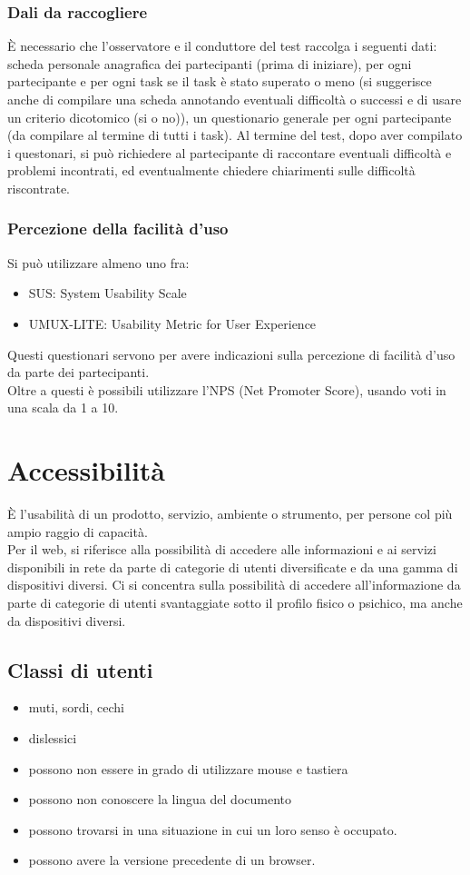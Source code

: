 \documentclass{article}
\begin{document}
\subsubsection{Dali da raccogliere}
È necessario che l'osservatore e il conduttore del test raccolga i seguenti dati: scheda personale anagrafica dei partecipanti (prima di iniziare), per ogni partecipante e per ogni task se il task è stato superato o meno (si suggerisce anche di compilare una scheda annotando eventuali difficoltà o successi e di usare un criterio dicotomico (si o no)), un questionario generale per ogni partecipante (da compilare al termine di tutti i task). Al termine del test, dopo aver compilato i questonari, si può richiedere al partecipante di raccontare eventuali difficoltà e problemi incontrati, ed eventualmente chiedere chiarimenti sulle difficoltà riscontrate.
\subsubsection{Percezione della facilità d'uso}
Si può utilizzare almeno uno fra:
\begin{itemize}
	\item SUS: System Usability Scale
	\item UMUX-LITE: Usability Metric for User Experience
\end{itemize}
Questi questionari servono per avere indicazioni sulla percezione di facilità d'uso da parte dei partecipanti.\\
Oltre a questi è possibili utilizzare l'NPS (Net Promoter Score), usando voti in una scala da 1 a 10.
\section{Accessibilità}
È l'usabilità di un prodotto, servizio, ambiente o strumento, per persone col più ampio raggio di capacità.\\
Per il web, si riferisce alla possibilità di accedere alle informazioni e ai servizi disponibili in rete da parte di categorie di utenti diversificate e da una gamma di dispositivi diversi. Ci si concentra sulla possibilità di accedere all'informazione da parte di categorie di utenti svantaggiate sotto il profilo fisico o psichico, ma anche da dispositivi diversi.
\subsection{Classi di utenti}
\begin{itemize}
	\item muti, sordi, cechi
	\item dislessici
	\item possono non essere in grado di utilizzare mouse e tastiera
	\item possono non conoscere la lingua del documento
	\item possono trovarsi in una situazione in cui un loro senso è occupato.
	\item possono avere la versione precedente di un browser.
\end{itemize}
\end{document}
